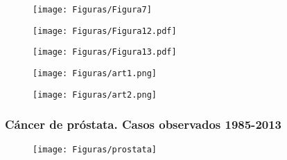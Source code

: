 \documentclass{beamer}
\begin{document}
\begin{frame}

\begin{figure}
	\centering
	\texttt{[image: Figuras/Figura7]}
\end{figure}

\end{frame}


\begin{frame}

	\begin{figure}
		\centering
		\texttt{[image: Figuras/Figura12.pdf]}
	\end{figure}

\end{frame}


\begin{frame}

\begin{figure}
	\centering
	\texttt{[image: Figuras/Figura13.pdf]}
\end{figure}

\end{frame}

\begin{frame}

\begin{figure}
	\centering
	\texttt{[image: Figuras/art1.png]}
\end{figure}

\end{frame}

\begin{frame}

\begin{figure}
	\centering
	\texttt{[image: Figuras/art2.png]}
\end{figure}

\end{frame}



\begin{frame}\frametitle{Cáncer de próstata. Casos observados 1985-2013}
\vspace{-10pt}
\begin{figure}
\centering
\texttt{[image: Figuras/prostata]}
\end{figure}

\end{frame}
\end{document}
